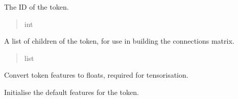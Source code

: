 \documentclass[letterpaper,10pt,english]{sphinxmanual}
\begin{document}
\begin{fulllineitems}

\begin{fulllineitems}
\label{\detokenize{nodes:nodes.nodeBuilder.Token.ID}}
\pysigstartsignatures
\pysigline
{}
\pysigstopsignatures
\sphinxAtStartPar
The ID of the token.
\begin{quote}\begin{description}
\sphinxAtStartPar
int

\end{description}\end{quote}

\end{fulllineitems}


\begin{fulllineitems}
\label{\detokenize{nodes:nodes.nodeBuilder.Token.children}}
\pysigstartsignatures
\pysigline
{}
\pysigstopsignatures
\sphinxAtStartPar
A list of children of the token, for use in building the connections matrix.
\begin{quote}\begin{description}
\sphinxAtStartPar
list

\end{description}\end{quote}

\end{fulllineitems}


\begin{fulllineitems}
\label{\detokenize{nodes:nodes.nodeBuilder.Token.floatate_features}}
\pysigstartsignatures
\pysiglinewithargsret
{}
{}
{}
\pysigstopsignatures
\sphinxAtStartPar
Convert token features to floats, required for tensorisation.

\end{fulllineitems}


\begin{fulllineitems}
\label{\detokenize{nodes:nodes.nodeBuilder.Token.initialise_defaults}}
\pysigstartsignatures
\pysiglinewithargsret
{}
{}
{}
\pysigstopsignatures
\sphinxAtStartPar
Initialise the default features for the token.

\end{fulllineitems}


\end{fulllineitems}
\end{document}
